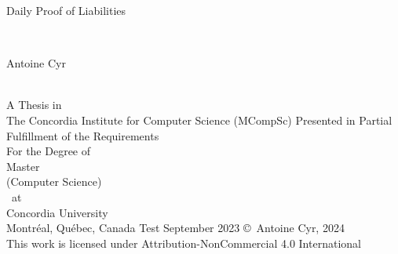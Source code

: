 
\thispagestyle{empty} %

\begin{center} 
\begin{Large} Daily Proof of Liabilities \end{Large}\\[3em]
\begin{large} Antoine Cyr \end{large}\\
\vfill
A Thesis in\\
The Concordia Institute for Computer Science (MCompSc)
\vfill
Presented in Partial Fulfillment of the Requirements\\
For the Degree of\\
Master\\ 
(Computer Science)\\~at\\
Concordia University\\
Montr\'{e}al, Qu\'{e}bec, Canada
Test
\vfill
September 2023
\vfill
\copyright~Antoine Cyr, 2024\\
This work is licensed under Attribution-NonCommercial 4.0 International
\end{center}

